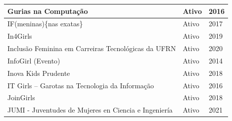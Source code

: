 \begin{longtable}{|l|l|l|}
Gurias na Computação                                                                                                                                        & Ativo                        & 2016                        \\ \hline
IF(meninas)\{nas exatas\}                                                                                                                                   & Ativo                        & 2017                        \\ \hline
In4Girls                                                                                                                                                    & Ativo                        & 2019                        \\ \hline
Inclusão Feminina em Carreiras Tecnológicas da UFRN                                                                                                         & Ativo                        & 2020                        \\ \hline
InfoGirl (Evento)                                                                                                                                           & Ativo                        & 2014                        \\ \hline
Inova Kids Prudente                                                                                                                                         & Ativo                        & 2018                        \\ \hline
IT Girls – Garotas na Tecnologia da Informação                                                                                                              & Ativo                        & 2016                        \\ \hline
JoinGirls                                                                                                                                                   & Ativo                        & 2018                        \\ \hline
  
JUMI - Juventudes de Mujeres en Ciencia e Ingeniería                                                                                                        & Ativo                        & 2021                        \\ \hline
  

\end{longtable}
